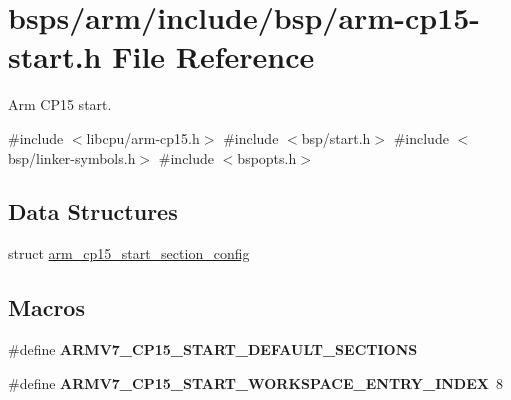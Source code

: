 \hypertarget{arm-cp15-start_8h}{}\section{bsps/arm/include/bsp/arm-\/cp15-\/start.h File Reference}
\label{arm-cp15-start_8h}


Arm C\+P15 start.  


{\ttfamily \#include $<$libcpu/arm-\/cp15.\+h$>$}\newline
{\ttfamily \#include $<$bsp/start.\+h$>$}\newline
{\ttfamily \#include $<$bsp/linker-\/symbols.\+h$>$}\newline
{\ttfamily \#include $<$bspopts.\+h$>$}\newline
\subsection*{Data Structures}
\begin{DoxyCompactItemize}
\item 
struct \mbox{\hyperlink{structarm__cp15__start__section__config}{arm\+\_\+cp15\+\_\+start\+\_\+section\+\_\+config}}
\end{DoxyCompactItemize}
\subsection*{Macros}
\begin{DoxyCompactItemize}
\item 
\mbox{\label{arm-cp15-start_8h_a216ad63547a63ec967599f7f47fb9524}} 
\#define {\bfseries A\+R\+M\+V7\+\_\+\+C\+P15\+\_\+\+S\+T\+A\+R\+T\+\_\+\+D\+E\+F\+A\+U\+L\+T\+\_\+\+S\+E\+C\+T\+I\+O\+NS}
\item 
\mbox{\label{arm-cp15-start_8h_a9acb9a298cd3c785faba7e37b7755026}} 
\#define {\bfseries A\+R\+M\+V7\+\_\+\+C\+P15\+\_\+\+S\+T\+A\+R\+T\+\_\+\+W\+O\+R\+K\+S\+P\+A\+C\+E\+\_\+\+E\+N\+T\+R\+Y\+\_\+\+I\+N\+D\+EX}~8
\end{DoxyCompactItemize}
